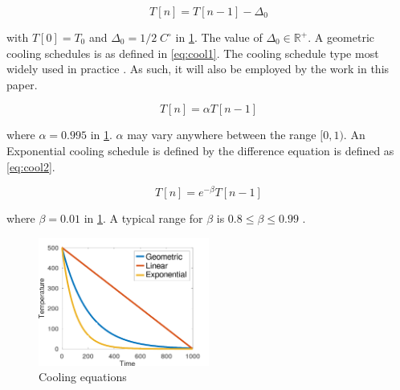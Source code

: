 \documentclass[11pt,a4paper,final]{article}
\newcommand{\Tau}{T}                        %
\begin{document}
\begin{equation}
\label{eq:cool0}
\Tau[n] = \Tau[n-1] - \Delta_0
\end{equation}

with \(\Tau[0] = \Tau_0\) and \(\Delta_0 = 1/2\; C^\circ\) in \ref{fig:cool}. The value of \(\Delta_0 \in \mathbb{R}^+\). A geometric cooling schedules is as
defined in \ref{eq:cool1}. The cooling schedule type most widely used in practice \cite{keller-2019-multi-objec}. As such, it
will also be employed by the work in this paper.

\begin{equation}
\label{eq:cool1}
\Tau[n] = \alpha \Tau[n-1]
\end{equation}

where \(\alpha = 0.995\) in \ref{fig:cool}. \(\alpha\) may vary anywhere between the range \([0,1)\). An Exponential cooling schedule is
defined by the difference equation is defined as \ref{eq:cool2}.

\begin{equation}
\label{eq:cool2}
\Tau[n] = e^{-\beta}\Tau[n-1]
\end{equation}

where \(\beta = 0.01\) in \ref{fig:cool}. A typical range for \(\beta\) is \(0.8 \le \beta \le 0.99\) \cite{delahaye-2019-simul}.

\begin{figure}[htbp]
\centering
\includegraphics[width=0.5\textwidth]{sections/img/cool_func.png}
\caption{\label{fig:cool}Cooling equations}
\end{figure}
\end{document}
